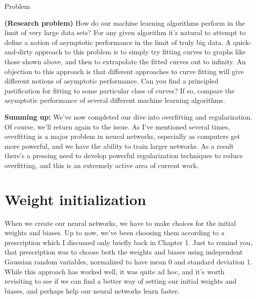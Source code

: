 \documentclass[a4paper,twoside,10pt]{book}
\begin{document}
\begin{exercize}{Problem}
	\item \textbf{(Research problem)} How do our machine learning algorithms perform in the limit of very large data sets? For any given algorithm it's natural to attempt to define a notion of asymptotic performance in the limit of truly big data. A quick-and-dirty approach to this problem is to simply try fitting curves to graphs like those shown above, and then to extrapolate the fitted curves out to infinity. An objection to this approach is that different approaches to curve fitting will give different notions of asymptotic performance. Can you find a principled justification for fitting to some particular class of curves? If so, compare the asymptotic performance of several different machine learning algorithms.
\end{exercize}
\textbf{Summing up:} We've now completed our dive into overfitting and regularization. Of course, we'll return again to the issue. As I've mentioned several times, overfitting is a major problem in neural networks, especially as computers get more powerful, and we have the ability to train larger networks. As a result there's a pressing need to develop powerful regularization techniques to reduce overfitting, and this is an extremely active area of current work.

\section{Weight initialization}
\label{sec:3.3}
When we create our neural networks, we have to make choices for the initial weights and biases. Up to now, we've been choosing them according to a prescription which I discussed only briefly back in Chapter 1. Just to remind you, that prescription was to choose both the weights and biases using independent Gaussian random variables, normalized to have mean 0 and standard deviation 1. While this approach has worked well, it was quite ad hoc, and it's worth revisiting to see if we can find a better way of setting our initial weights and biases, and perhaps help our neural networks learn faster.
\end{document}
